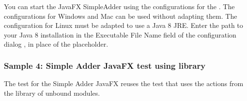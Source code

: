 You can start the JavaFX SimpleAdder using the configurations for the  \gdaut{}. The configurations for Windows and Mac can be used without adapting them. The configuration for Linux must be adapted to use a Java 8 JRE. Enter the path to your Java 8 installation in the Executable File Name field of the \gdaut{} configuration dialog , in place of the placeholder. 

\subsubsection{Sample 4: Simple Adder JavaFX test using library}
The test for the Simple Adder JavaFX reuses the test that uses the actions from the library of unbound modules.
